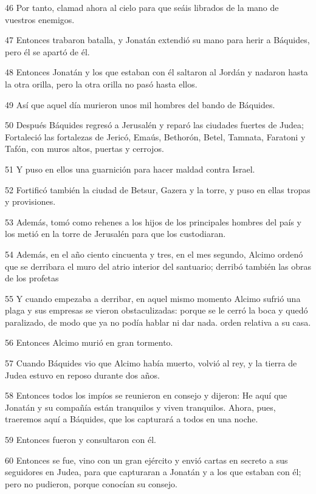\par 46 Por tanto, clamad ahora al cielo para que seáis librados de la mano de vuestros enemigos.
\par 47 Entonces trabaron batalla, y Jonatán extendió su mano para herir a Báquides, pero él se apartó de él.
\par 48 Entonces Jonatán y los que estaban con él saltaron al Jordán y nadaron hasta la otra orilla, pero la otra orilla no pasó hasta ellos.
\par 49 Así que aquel día murieron unos mil hombres del bando de Báquides.
\par 50 Después Báquides regresó a Jerusalén y reparó las ciudades fuertes de Judea; Fortaleció las fortalezas de Jericó, Emaús, Bethorón, Betel, Tamnata, Faratoni y Tafón, con muros altos, puertas y cerrojos.
\par 51 Y puso en ellos una guarnición para hacer maldad contra Israel.
\par 52 Fortificó también la ciudad de Betsur, Gazera y la torre, y puso en ellas tropas y provisiones.
\par 53 Además, tomó como rehenes a los hijos de los principales hombres del país y los metió en la torre de Jerusalén para que los custodiaran.
\par 54 Además, en el año ciento cincuenta y tres, en el mes segundo, Alcimo ordenó que se derribara el muro del atrio interior del santuario; derribó también las obras de los profetas
\par 55 Y cuando empezaba a derribar, en aquel mismo momento Alcimo sufrió una plaga y sus empresas se vieron obstaculizadas: porque se le cerró la boca y quedó paralizado, de modo que ya no podía hablar ni dar nada. orden relativa a su casa.
\par 56 Entonces Alcimo murió en gran tormento.
\par 57 Cuando Báquides vio que Alcimo había muerto, volvió al rey, y la tierra de Judea estuvo en reposo durante dos años.
\par 58 Entonces todos los impíos se reunieron en consejo y dijeron: He aquí que Jonatán y su compañía están tranquilos y viven tranquilos. Ahora, pues, traeremos aquí a Báquides, que los capturará a todos en una noche.
\par 59 Entonces fueron y consultaron con él.
\par 60 Entonces se fue, vino con un gran ejército y envió cartas en secreto a sus seguidores en Judea, para que capturaran a Jonatán y a los que estaban con él; pero no pudieron, porque conocían su consejo.
